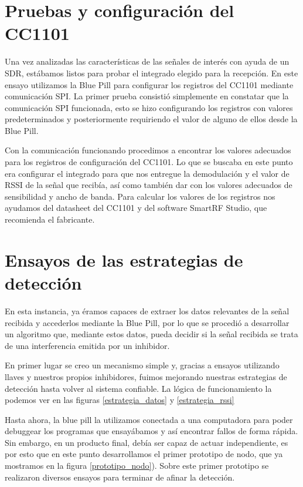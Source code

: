 \section {Pruebas y configuración del CC1101}

Una vez analizadas las características de las señales de interés con ayuda de un SDR, estábamos listos para probar el integrado elegido para la
recepción. En este ensayo utilizamos la Blue Pill para configurar los registros del CC1101 mediante comunicación SPI.
La primer prueba consistió simplemente en constatar que la comunicación SPI funcionada, esto se hizo configurando los registros con valores predeterminados 
y posteriormente requiriendo el valor de alguno de ellos desde la Blue Pill.\par 
Con la comunicación funcionando procedimos a encontrar los valores adecuados para los registros de configuración del CC1101.
Lo que se buscaba en este punto era configurar el integrado para que nos entregue la demodulación y el valor de RSSI de la señal que recibía, 
así como también dar con los valores adecuados de sensibilidad y ancho de banda. Para calcular los valores de los registros nos ayudamos del datasheet del CC1101
y del software SmartRF Studio, que recomienda el fabricante.

\section{Ensayos de las estrategias de detección}

En esta instancia, ya éramos capaces de extraer los datos relevantes de la señal recibida y accederlos mediante la Blue Pill, por lo que se procedió a
desarrollar un algoritmo que, mediante estos datos, pueda decidir si la señal recibida se trata de una interferencia emitida por un inhibidor.\par
En primer lugar se creo un mecanismo simple y, gracias a ensayos utilizando llaves y nuestros propios inhibidores, fuimos mejorando nuestras estrategias
de detección hasta volver al sistema confiable. La lógica de funcionamiento la podemos ver en las figuras \ref{estrategia_datos} y \ref{estrategia_rssi}\par 
Hasta ahora, la blue pill la utilizamos conectada a una computadora para poder debuggear los programas que ensayábamos y así encontrar fallos de forma
rápida. Sin embargo, en un producto final, debía ser capaz de actuar independiente, es por esto que en este punto desarrollamos el primer
prototipo de nodo, que ya mostramos en la figura \ref{prototipo_nodo}). Sobre este primer prototipo se realizaron diversos ensayos para terminar
de afinar la detección. \par

